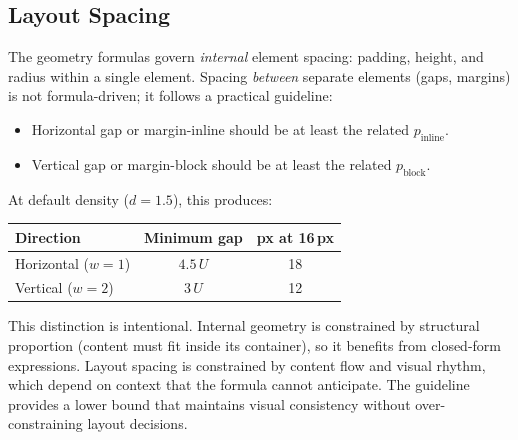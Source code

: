 \subsection{Layout Spacing}
\label{sec:layout-spacing}

The geometry formulas govern \emph{internal} element spacing: padding, height, and radius within a single element. Spacing \emph{between} separate elements (gaps, margins) is not formula-driven; it follows a practical guideline:

\begin{itemize}
  \item Horizontal gap or margin-inline should be at least the related $p_{\text{inline}}$.
  \item Vertical gap or margin-block should be at least the related $p_{\text{block}}$.
\end{itemize}

At default density ($d = 1.5$), this produces:

\begin{center}
\begin{tabular}{lcc}
\toprule
Direction & Minimum gap & px at 16\,px \\
\midrule
Horizontal ($w = 1$) & $4.5\,U$ & 18 \\
Vertical ($w = 2$) & $3\,U$ & 12 \\
\bottomrule
\end{tabular}
\end{center}

This distinction is intentional. Internal geometry is constrained by structural proportion (content must fit inside its container), so it benefits from closed-form expressions. Layout spacing is constrained by content flow and visual rhythm, which depend on context that the formula cannot anticipate. The guideline provides a lower bound that maintains visual consistency without over-constraining layout decisions.
